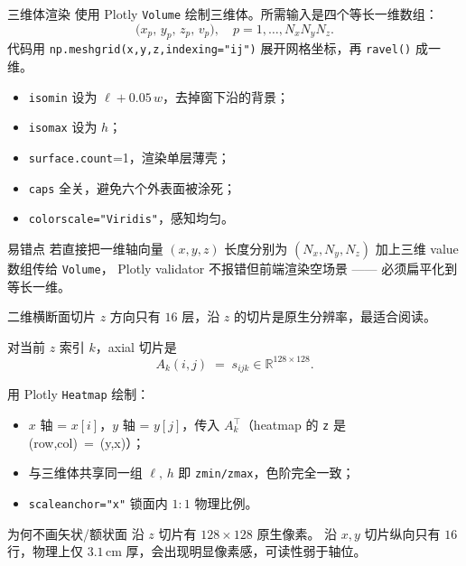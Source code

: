 \documentclass[aspectratio=169,11pt]{ctexbeamer}
\newcommand{\R}{\mathbb R}
\begin{document}
\begin{frame}{三维体渲染}
  \small
  使用 Plotly \texttt{Volume} 绘制三维体。所需输入是四个等长一维数组：
  \[
    \bigl(x_p,\,y_p,\,z_p,\,v_p\bigr),\quad p=1,\dots,N_xN_yN_z .
  \]
  代码用 \texttt{np.meshgrid(x,y,z,indexing="ij")} 展开网格坐标，再
  \texttt{ravel()} 成一维。

  \begin{itemize}
    \item \texttt{isomin} 设为 $\ell+0.05\,w$，去掉窗下沿的背景；
    \item \texttt{isomax} 设为 $h$；
    \item \texttt{surface.count}=1，渲染单层薄壳；
    \item \texttt{caps} 全关，避免六个外表面被涂死；
    \item \texttt{colorscale="Viridis"}，感知均匀。
  \end{itemize}

  \begin{block}{易错点}
    若直接把一维轴向量 $(x,y,z)$ 长度分别为 $(N_x,N_y,N_z)$ 加上三维 value 数组传给 \texttt{Volume}，
    Plotly validator 不报错但前端渲染空场景 —— 必须扁平化到等长一维。
  \end{block}
\end{frame}

\begin{frame}{二维横断面切片}
  \small
  $z$ 方向只有 $16$ 层，沿 $z$ 的切片是原生分辨率，最适合阅读。

  对当前 $z$ 索引 $k$，axial 切片是
  \[
    A_k(i,j)\;=\;s_{ijk}\in\R^{128\times128}.
  \]

  用 Plotly \texttt{Heatmap} 绘制：
  \begin{itemize}
    \item $x$ 轴 = $x[i]$，$y$ 轴 = $y[j]$，传入 $A_k^{\top}$（heatmap 的 \texttt{z} 是 \mbox{(row,col) = (y,x)}）；
    \item 与三维体共享同一组 $\ell,\,h$ 即 \texttt{zmin/zmax}，色阶完全一致；
    \item \texttt{scaleanchor="x"} 锁面内 $1{:}1$ 物理比例。
  \end{itemize}

  \begin{block}{为何不画矢状/额状面}
    沿 $z$ 切片有 $128\times 128$ 原生像素。
    沿 $x,y$ 切片纵向只有 $16$ 行，物理上仅 $3.1\,\mathrm{cm}$ 厚，会出现明显像素感，可读性弱于轴位。
  \end{block}
\end{frame}
\end{document}
